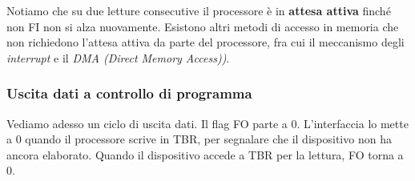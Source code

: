 \documentclass[a4paper,11pt]{article}
\begin{document}
Notiamo che su due letture consecutive il processore è in \textbf{attesa attiva} finché non FI non si alza nuovamente.
Esistono altri metodi di accesso in memoria che non richiedono l'attesa attiva da parte del processore, fra cui il meccanismo degli \textit{interrupt} e il \textit{DMA (Direct Memory Access))}.

\subsubsection{Uscita dati a controllo di programma}
Vediamo adesso un ciclo di uscita dati.
Il flag FO parte a 0.
L'interfaccia lo mette a 0 quando il processore scrive in TBR, per segnalare che il dispositivo non ha ancora elaborato.
Quando il dispositivo accede a TBR per la lettura, FO torna a 0.
\end{document}
